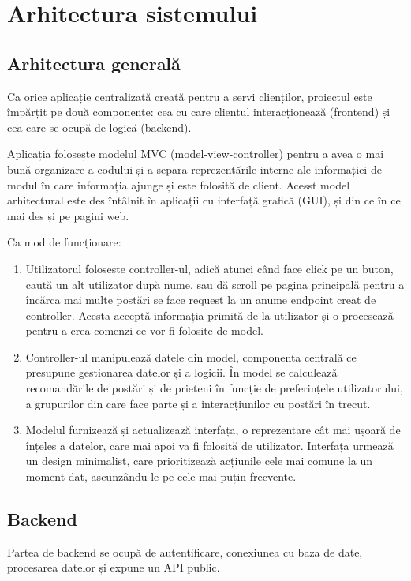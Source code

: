 
\chapter{Arhitectura sistemului}
\label{Arhitectura sistemului}
    \section{Arhitectura generală}
    \label{Arhitectura generală}
    Ca orice aplicație centralizată creată pentru a servi clienților, proiectul este împărțit pe două componente: cea cu care clientul interacționează (frontend) și cea care se ocupă de logică (backend).

    Aplicația folosește modelul MVC (model-view-controller) pentru a avea o mai bună organizare a codului și a separa reprezentările interne ale informației de modul în care informația ajunge și este folosită de client. Acesst model arhitectural este des întâlnit în aplicații cu interfață grafică (GUI), și din ce în ce mai des și pe pagini web. 
    
    Ca mod de funcționare:
    \begin{enumerate}[noitemsep, label=\textbullet, leftmargin=0.3cm]
        \item Utilizatorul folosește controller-ul, adică atunci când face click pe un buton, caută un alt utilizator după nume, sau dă scroll pe pagina principală pentru a încărca mai multe postări se face request la un anume endpoint creat de controller. Acesta acceptă informația primită de la utilizator și o procesează pentru a crea comenzi ce vor fi folosite de model.
        \item Controller-ul manipulează datele din model, componenta centrală ce presupune gestionarea datelor și a logicii. În model se calculează recomandările de postări și de prieteni în funcție de preferințele utilizatorului, a grupurilor din care face parte și a interacțiunilor cu postări în trecut.
        \item Modelul furnizează și actualizează interfața, o reprezentare cât mai ușoară de înțeles a datelor, care mai apoi va fi folosită de utilizator. Interfața urmează un design minimalist, care prioritizează acțiunile cele mai comune la un moment dat, ascunzându-le pe cele mai puțin frecvente. 
    \end{enumerate}
    
    \section{Backend}
    \label{Backend}
    Partea de backend se ocupă de autentificare, conexiunea cu baza de date, procesarea datelor și expune un API public.
